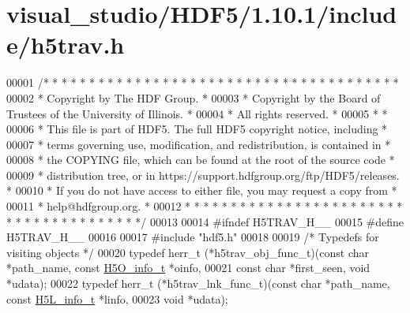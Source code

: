 \hypertarget{visual__studio_2_h_d_f5_21_810_81_2include_2h5trav_8h_source}{}\section{visual\+\_\+studio/\+H\+D\+F5/1.10.1/include/h5trav.h}
\label{visual__studio_2_h_d_f5_21_810_81_2include_2h5trav_8h_source}

\begin{DoxyCode}
00001 \textcolor{comment}{/* * * * * * * * * * * * * * * * * * * * * * * * * * * * * * * * * * * * * * *}
00002 \textcolor{comment}{ * Copyright by The HDF Group.                                               *}
00003 \textcolor{comment}{ * Copyright by the Board of Trustees of the University of Illinois.         *}
00004 \textcolor{comment}{ * All rights reserved.                                                      *}
00005 \textcolor{comment}{ *                                                                           *}
00006 \textcolor{comment}{ * This file is part of HDF5.  The full HDF5 copyright notice, including     *}
00007 \textcolor{comment}{ * terms governing use, modification, and redistribution, is contained in    *}
00008 \textcolor{comment}{ * the COPYING file, which can be found at the root of the source code       *}
00009 \textcolor{comment}{ * distribution tree, or in https://support.hdfgroup.org/ftp/HDF5/releases.  *}
00010 \textcolor{comment}{ * If you do not have access to either file, you may request a copy from     *}
00011 \textcolor{comment}{ * help@hdfgroup.org.                                                        *}
00012 \textcolor{comment}{ * * * * * * * * * * * * * * * * * * * * * * * * * * * * * * * * * * * * * * */}
00013 
00014 \textcolor{preprocessor}{#ifndef H5TRAV\_H\_\_}
00015 \textcolor{preprocessor}{#define H5TRAV\_H\_\_}
00016 
00017 \textcolor{preprocessor}{#include "hdf5.h"}
00018 
00019 \textcolor{comment}{/* Typedefs for visiting objects */}
00020 \textcolor{keyword}{typedef} herr\_t (*h5trav\_obj\_func\_t)(\textcolor{keyword}{const} \textcolor{keywordtype}{char} *path\_name, \textcolor{keyword}{const} \hyperlink{struct_h5_o__info__t}{H5O\_info\_t} *oinfo,
00021         \textcolor{keyword}{const} \textcolor{keywordtype}{char} *first\_seen, \textcolor{keywordtype}{void} *udata);
00022 \textcolor{keyword}{typedef} herr\_t (*h5trav\_lnk\_func\_t)(\textcolor{keyword}{const} \textcolor{keywordtype}{char} *path\_name, \textcolor{keyword}{const} \hyperlink{struct_h5_l__info__t}{H5L\_info\_t} *linfo,
00023         \textcolor{keywordtype}{void} *udata);

\end{DoxyCode}
